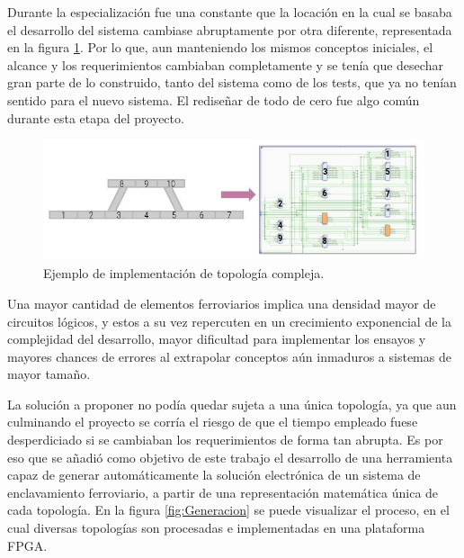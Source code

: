 		\vspace{5cm}
		
		Durante la especialización fue una constante que la locación en la cual se basaba el desarrollo del sistema cambiase abruptamente por otra diferente, representada en la figura \ref{fig:CESE_2}. Por lo que, aun manteniendo los mismos conceptos iniciales, el alcance y los requerimientos cambiaban completamente y se tenía que desechar gran parte de lo construido, tanto del sistema como de los tests, que ya no tenían sentido para el nuevo sistema. El rediseñar de todo de cero fue algo común durante esta etapa del proyecto.
		
		\begin{figure}[htbp!]
			\centering
			\includegraphics[scale=.5]{./Figures/Grafo_VHDL_B}
			\caption{Ejemplo de implementación de topología compleja.}
			\label{fig:CESE_2}
		\end{figure}
			
		Una mayor cantidad de elementos ferroviarios implica una densidad mayor de circuitos lógicos, y estos a su vez repercuten en un crecimiento exponencial de la complejidad del desarrollo, mayor dificultad para implementar los ensayos y mayores chances de errores al extrapolar conceptos aún inmaduros a sistemas de mayor tamaño.
		
		La solución a proponer no podía quedar sujeta a una única topología, ya que aun culminando el proyecto se corría el riesgo de que el tiempo empleado fuese desperdiciado si se cambiaban los requerimientos de forma tan abrupta. Es por eso que se añadió como objetivo de este trabajo el desarrollo de una herramienta capaz de generar automáticamente la solución electrónica de un sistema de enclavamiento ferroviario, a partir de una representación matemática única de cada topología. En la figura \ref{fig:Generacion} se puede visualizar el proceso, en el cual diversas topologías son procesadas e implementadas en una plataforma FPGA.
		
